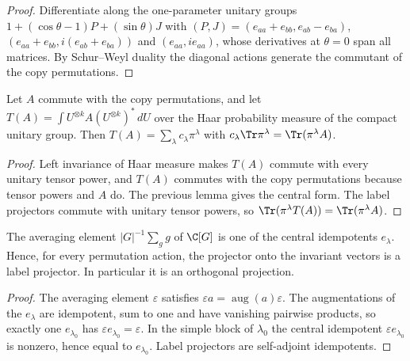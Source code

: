 \begin{proof}\leanok
    Differentiate along the one-parameter unitary groups
    $1+(\cos\theta-1)P+(\sin\theta)J$ with
    $(P,J)=(e_{aa}+e_{bb},e_{ab}-e_{ba})$, $(e_{aa}+e_{bb},i(e_{ab}+e_{ba}))$ and
    $(e_{aa},ie_{aa})$, whose derivatives at $\theta=0$ span all matrices. By
    Schur--Weyl duality the diagonal actions generate the commutant of the copy
    permutations.
\end{proof}

\begin{theorem}
    \label{thm:unitary_twirl}
    \leanok
    Let $A$ commute with the copy permutations, and let
    $T(A)=\int U^{\otimes k}A(U^{\otimes k})^\ast\,dU$ over the Haar probability measure
    of the compact unitary group. Then $T(A)=\sum_\lambda c_\lambda\pi^\lambda$ with
    $c_\lambda\Tr\pi^\lambda=\Tr(\pi^\lambda A)$.
\end{theorem}

\begin{proof}\leanok
    Left invariance of Haar measure makes $T(A)$ commute with every unitary tensor
    power, and $T(A)$ commutes with the copy permutations because tensor powers and $A$
    do. The previous lemma gives the central form. The label projectors commute with
    unitary tensor powers, so $\Tr(\pi^\lambda T(A))=\Tr(\pi^\lambda A)$.
\end{proof}

\begin{lemma}
    \label{lem:trivial_label}
    \leanok
    The averaging element $|G|^{-1}\sum_gg$ of $\C[G]$ is one of the central idempotents
    $e_\lambda$. Hence, for every permutation action, the projector onto the invariant
    vectors is a label projector. In particular it is an orthogonal projection.
\end{lemma}

\begin{proof}\leanok
    The averaging element $\varepsilon$ satisfies $\varepsilon a=\operatorname{aug}(a)\varepsilon$.
    The augmentations of the $e_\lambda$ are idempotent, sum to one and have vanishing
    pairwise products, so exactly one $e_{\lambda_0}$ has $\varepsilon e_{\lambda_0}=\varepsilon$.
    In the simple block of $\lambda_0$ the central idempotent $\varepsilon e_{\lambda_0}$ is
    nonzero, hence equal to $e_{\lambda_0}$. Label projectors are self-adjoint idempotents.
\end{proof}

